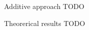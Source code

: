 \begin{frame}{Additive approach}
	TODO
\end{frame}

\begin{frame}{Theorerical results}
	TODO
\end{frame}
